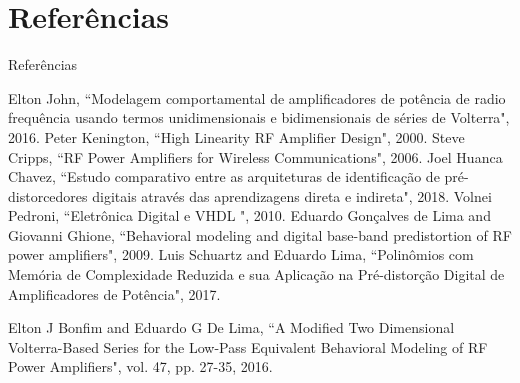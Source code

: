 \documentclass{if-beamer}
\begin{document}
\section*{Referências}
\begin{frame}{Referências}
	
		\begin{thebibliography}{}
		 Elton John, ``Modelagem comportamental de amplificadores de potência de radio frequência usando termos unidimensionais e bidimensionais de séries de Volterra", 2016.
		 Peter Kenington, ``High Linearity RF Amplifier Design", 2000.
		 Steve Cripps, ``RF Power Amplifiers for Wireless Communications", 2006.
		 Joel Huanca Chavez, ``Estudo comparativo entre as arquiteturas de identificação de pré-distorcedores digitais através das aprendizagens direta e indireta", 2018.
		 Volnei Pedroni, ``Eletrônica Digital e VHDL ", 2010.
		 Eduardo Gonçalves de Lima and Giovanni Ghione, ``Behavioral modeling and digital base-band predistortion of RF power amplifiers", 2009.
		 Luis Schuartz and Eduardo Lima, ``Polinômios com Memória de Complexidade Reduzida e sua Aplicação na Pré-distorção Digital de Amplificadores de Potência", 2017.
		
		 Elton J Bonfim and Eduardo G De Lima, ``A Modified Two Dimensional Volterra-Based Series for the Low-Pass Equivalent Behavioral Modeling of RF Power Amplifiers", vol. 47, pp. 27-35, 2016.
		
		
	\end{thebibliography}

\end{frame}


\end{document}
